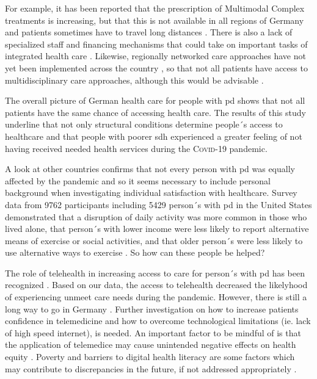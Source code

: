 \documentclass{bmcart}
\begin{document}

For example, it has been reported that the prescription of Multimodal Complex treatments is increasing, but that this is not available in all regions of Germany and patients sometimes have to travel long distances \cite{richter2019dynamics}. There is also a lack of specialized staff and financing mechanisms that could take on important tasks of integrated health care \cite{prell2020specialized}. Likewise, regionally networked care approaches have not yet been implemented across the country \cite{van2020building}, so that not all patients have access to multidisciplinary care approaches, although this would be advisable \cite{radder2020recommendations}.

The overall picture of German health care for people with \ac{pd} shows that not all patients have the same chance of accessing health care. The results of this study underline that not only structural conditions determine people´s access to healthcare and that people with poorer \ac{sdh} experienced a greater feeling of not having received needed health services during the \textsc{Covid}-19 pandemic.

A look at other countries confirms that not every person with \ac{pd} was equally affected by the pandemic and so it seems necessary to include personal background when investigating individual satisfaction with healthcare. Survey data from 9762 participants including 5429 person´s with \ac{pd} in the United States demonstrated that a disruption of daily activity was more common in those who lived alone, that person´s with lower income were less likely to report alternative means of exercise or social activities, and that older person´s were less likely to use alternative ways to exercise \cite{brown2020effect}. So how can these people be helped?


The role of telehealth in increasing access to care for person´s with \ac{pd} has been recognized \cite{achey2014past, van2021state}. Based on our data, the access to telehealth decreased the likelyhood of experiencing unmeet care needs during the pandemic. However, there is still a long way to go in Germany \cite{eggers2020care}. Further investigation on how to increase patients confidence in telemedicine and how to overcome technological limitations (ie. lack of high speed internet), is needed. An important factor to be mindful of is that the application of telemedice may cause unintended negative effects on health equity \cite{samuels2021digital}. Poverty and barriers to digital health literacy are some factors which may contribute to discrepancies in the future, if not addressed appropriately \cite{samuels2021digital}. 
\end{document}
